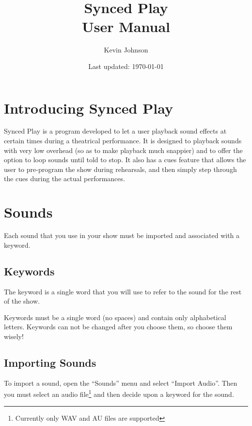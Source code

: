 \documentclass{article}
\begin{document}
\title{Synced Play \\ User Manual}
\author{Kevin Johnson}
\date{Last updated: \today}
\maketitle{}

\newpage

\tableofcontents

\newpage

\section{Introducing Synced Play}

Synced Play is a program developed to let a user playback sound effects
at certain times during a theatrical performance. It is designed to
playback sounds with very low overhead (so as to make playback much snappier)
and to offer the option to loop sounds until told to stop. It also has a
cues feature that allows the user to pre-program the show during rehearsals,
and then simply step through the cues during the actual performances.

\newpage

\section{Sounds}

Each sound that you use in your show must be imported and associated with
a keyword.

\subsection{Keywords}

The keyword is a single word that you will use to refer to the sound for
the rest of the show.

Keywords must be a single word (no spaces) and contain only alphabetical
letters. Keywords can not be changed after you choose them, so choose
them wisely!

\subsection{Importing Sounds}

To import a sound, open the ``Sounds'' menu and select ``Import Audio''. Then
you must select an audio file\footnote{Currently only WAV and AU files
are supported} and then decide upon a keyword for the sound.
\end{document}
